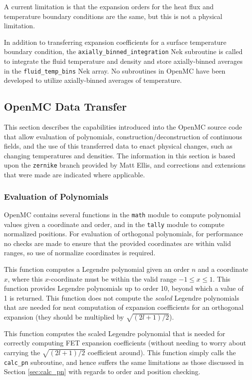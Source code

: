 \documentclass[10pt]{article}
\newcounter{subsubsubsection}[subsubsection]
\numberwithin{equation}{section} %
\begin{document}
\color{magenta} A current limitation is that the expansion orders for the heat flux and temperature boundary conditions are the same, but this is not a physical limitation. \color{black}

In addition to transferring expansion coefficients for a surface temperature boundary condition, the {\tt axially\_binned\_integration} Nek subroutine is called to integrate the fluid temperature and density and store axially-binned averages in the {\tt fluid\_temp\_bins} Nek array. No subroutines in OpenMC have been developed to utilize axially-binned averages of temperature.

\subsection{OpenMC Data Transfer}
\label{sec:OpenMCTransfer}
This section describes the capabilities introduced into the OpenMC source code that allow evaluation of polynomials, construction/deconstruction of continuous fields, and the use of this transferred data to enact physical changes, such as changing temperatures and densities. The information in this section is based upon the {\tt zernike} branch provided by Matt Ellis, and corrections and extensions that were made are indicated where applicable.

\subsubsection{Evaluation of Polynomials}
OpenMC contains several functions in the {\tt math} module to compute polynomial values given a coordinate and order, and in the {\tt tally} module to compute normalized positions. For evaluation of orthogonal polynomials, for performance no checks are made to ensure that the provided coordinates are within valid ranges, so use of normalize coordinates is required.

\label{sec:calc_pn}
This function computes a Legendre polynomial given an order \(n\) and a coordinate \(x\), where this \(x\)-coordinate must be within the valid range \(-1\leq x\leq1\). This function provides Legendre polynomials up to order 10, beyond which a value of 1 is returned. This function does not compute the {\it scaled} Legendre polynomials that are needed for neat computation of expansion coefficients for an orthogonal expansion (they should be multiplied by \(\sqrt{(2l+1)/2}\)). 

This function computes the scaled Legendre polynomial that is needed for correctly computing FET expansion coefficients (without needing to worry about carrying the \(\sqrt{(2l+1)/2}\) coefficient around). This function simply calls the {\tt calc\_pn} subroutine, and hence suffers the same limitations as those discussed in Section \ref{sec:calc_pn} with regards to order and position checking. 
\end{document}
